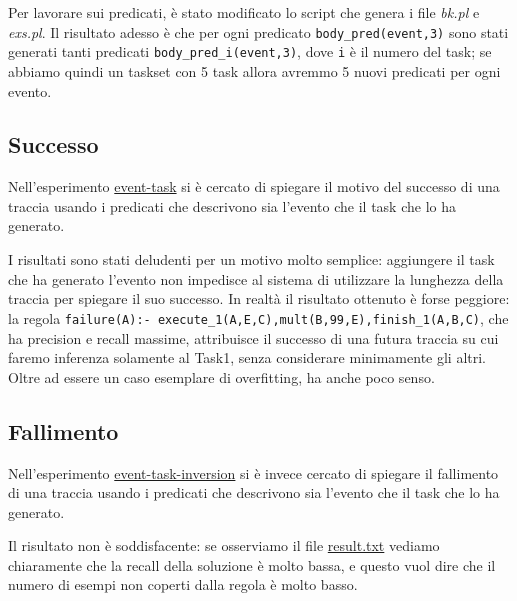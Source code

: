 Per lavorare sui predicati, è stato modificato lo script che genera i file \textit{bk.pl} e \textit{exs.pl}. Il risultato adesso è che per ogni predicato \texttt{body\_pred(event,3)} sono stati generati tanti predicati \texttt{body\_pred\_i(event,3)}, dove \texttt{i} è il numero del task; se abbiamo quindi un taskset con 5 task allora avremmo 5 nuovi predicati per ogni evento.

\subsection{Successo}
Nell'esperimento \href{https://github.com/edoardosarri24/prediction-in-data-driven-system/6-event-task/}{event-task} si è cercato di spiegare il motivo del successo di una traccia usando i predicati che descrivono sia l'evento che il task che lo ha generato.

I risultati sono stati deludenti per un motivo molto semplice: aggiungere il task che ha generato l'evento non impedisce al sistema di utilizzare la lunghezza della traccia per spiegare il suo successo. In realtà il risultato ottenuto è forse peggiore: la regola \texttt{failure(A):- execute\_1(A,E,C),mult(B,99,E),finish\_1(A,B,C)}, che ha precision e recall massime, attribuisce il successo di una futura traccia su cui faremo inferenza solamente al Task1, senza considerare minimamente gli altri. Oltre ad essere un caso esemplare di overfitting, ha anche poco senso.

\subsection{Fallimento}
Nell'esperimento \href{https://github.com/edoardosarri24/prediction-in-data-driven-system/7-event-task-inversion/}{event-task-inversion} si è invece cercato di spiegare il fallimento di una traccia usando i predicati che descrivono sia l'evento che il task che lo ha generato.

Il risultato non è soddisfacente: se osserviamo il file \href{https://github.com/edoardosarri24/prediction-in-data-driven-system/7-event-task-inversion/result.txt}{result.txt} vediamo chiaramente che la recall della soluzione è molto bassa, e questo vuol dire che il numero di esempi non coperti dalla regola è molto basso.
